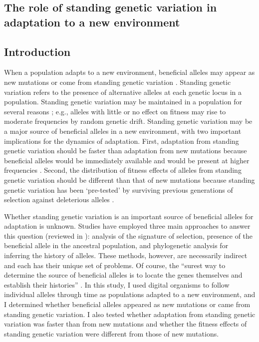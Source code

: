 \begin{doublespace}

\chapter{The role of standing genetic variation
  in adaptation to a new environment}
\label{chap:sgv}



\section{Introduction}



When a population adapts to a new environment,
beneficial alleles may appear as new mutations
or come from standing genetic variation \citep{bar08}.
%
Standing genetic variation refers to the presence
of alternative alleles at each genetic locus in a population.
%
Standing genetic variation may be maintained
in a population for several reasons \citep{har97};
e.g., alleles with little or no effect on fitness
may rise to moderate frequencies by random genetic drift.
%
Standing genetic variation may be a major source
of beneficial alleles in a new environment,
with two important implications for the dynamics of adaptation.
%
First, adaptation from standing genetic variation
should be faster than adaptation from new mutations
because beneficial alleles would be immediately available
and would be present at higher frequencies \citep{bar08}.
%
Second, the distribution of fitness effects of alleles
from standing genetic variation should be different
than that of new mutations because standing genetic variation
has been `pre-tested' by surviving previous generations
of selection against deleterious alleles \citep{bar08}.



Whether standing genetic variation is an important source
of beneficial alleles for adaptation is unknown.
%
Studies have employed three main approaches
to answer this question (reviewed in \citet{bar08}):
analysis of the signature of selection,
presence of the beneficial allele in the ancestral population,
and phylogenetic analysis for inferring the history of alleles.
%
These methods, however, are necessarily indirect
and each has their unique set of problems.
%
Of course, the ``surest way to determine
the source of beneficial alleles is to locate
the genes themselves and establish their histories'' \citep{bar08}.
%
In this study,
I used digital organisms to follow individual alleles
through time as populations adapted to a new environment,
and I determined whether beneficial alleles
appeared as new mutations or came from standing genetic variation.
%
I also tested whether adaptation from standing genetic variation
was faster than from new mutations
and whether the fitness effects of standing genetic variation
were different from those of new mutations.





\end{doublespace}
